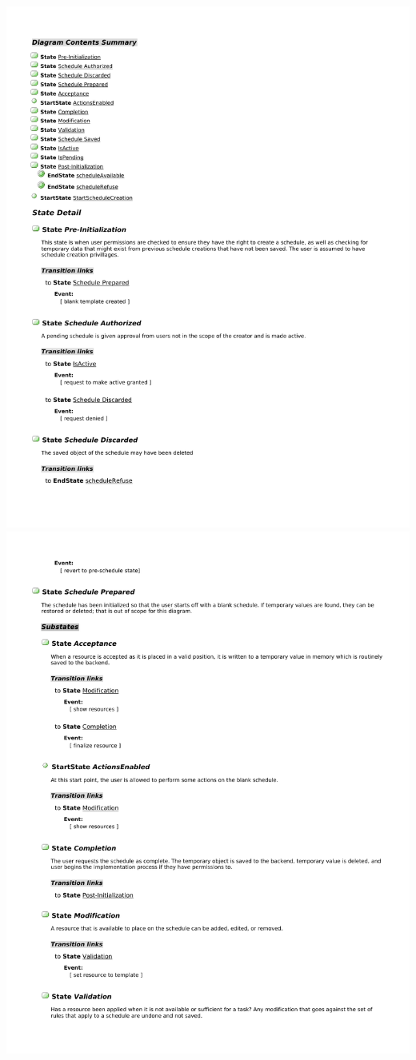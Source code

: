 \documentclass[letterpaper,12pt]{report}
\begin{document}
\includegraphics[scale=0.9,trim=20mm 30mm 25mm 20mm]{externals/NewSchedState2.pdf}
\newpage
\includegraphics[scale=0.9,trim=20mm 30mm 25mm 20mm]{externals/NewSchedState3.pdf}
\end{document}
